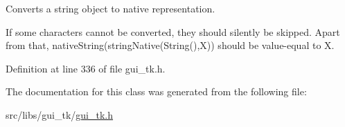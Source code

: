Converts a string object to native representation. 

If some characters cannot be converted, they should silently be skipped. Apart from that, {\ttfamily native\-String}(string\-Native(String(),X)) should be value-\/equal to {\ttfamily X}. 

Definition at line 336 of file gui\-\_\-tk.\-h.



The documentation for this class was generated from the following file\-:\begin{DoxyCompactItemize}
\item 
src/libs/gui\-\_\-tk/\hyperlink{gui__tk_8h}{gui\-\_\-tk.\-h}\end{DoxyCompactItemize}
